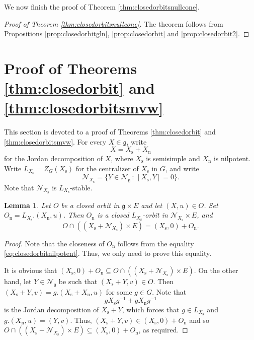 \documentclass[12pt]{amsart}
\newtheorem{lm}{Lemma}[section]
\theoremstyle{definition}
\theoremstyle{remark}\newtheorem{rmk}[lm]{Remark}
\newcommand{\CN}{{\mathcal {N}}}
\newcommand{\rn}{\mathrm{n}}
\newcommand{\rs}{\mathrm{s}}
\newcommand{\g}{\mathfrak g}
\renewcommand{\mid}{\,:\,}
\begin{document}
    We now finish the proof of Theorem \ref{thm:closedorbitsnullcone}.
    \begin{proof}[Proof of Theorem \ref{thm:closedorbitsnullcone}]
        The theorem follows from Propositions \ref{prop:closedorbitgln}, \ref{prop:closedorbit} and \ref{prop:closedorbit2}.
    \end{proof}
    
	\section{Proof of Theorems \ref{thm:closedorbit} and \ref{thm:closedorbitsmvw}}\label{sec:5}
This section is devoted to a proof of Theorems  \ref{thm:closedorbit} and \ref{thm:closedorbitsmvw}.	For every $X\in \g$, write  
	\begin{equation*}
		X=X_{\rs}+X_{\rn}
	\end{equation*}
    for the Jordan decomposition of $X$, where
	$X_{\rs}$ is semisimple and $X_{\rn}$ is nilpotent. 
Write $L_{X_{\rs}}=Z_{G}(X_{\rs})$ for the centralizer of $X_{\rs}$ in $G$, and write
	\begin{equation*}
		\CN_{X_{\rs}}=\{Y\in\CN_{\g}\mid [X_{\rs},Y]=0\}.
	\end{equation*}
    Note that $\CN_{X_{\rs}}$ is $L_{X_{\rs}}$-stable.
	\begin{lm}
		\label{lm:closedorbitnilpotent}
		Let $O$ be a closed orbit in $\g\times E$ and let $(X,u)\in O$. Set $O_{\rn}=L_{X_{\rs}}.(X_{\rn},u)$. Then $O_{\rn}$ is a closed $L_{X_{\rs}}$-orbit in $\CN_{X_{\rs}}\times E$, and
		\begin{equation}
			\label{eq:closedorbitnilpotent}
			O\cap \left((X_{\rs}+\CN_{X_{\rs}})\times E\right)=(X_{\rs},0)+O_{\rn}.
		\end{equation}
	\end{lm}
	\begin{proof}
	Note that	the closeness of $O_{\rn}$ follows from the equality \eqref{eq:closedorbitnilpotent}. Thus, we only need to prove  this equality. 
		
		It is obvious that $(X_{\rs},0)+O_{\rn}\subseteq O\cap \left((X_{\rs}+\CN_{X_{\rs}})\times E\right)$. On the other hand, let $Y\in\CN_{\g}$ be such that $(X_{\rs}+Y,v)\in O$. Then   $(X_{\rs}+Y,v)=g.(X_{\rs}+X_{\rn},u)$ for some $g\in G$. Note that
		\begin{equation*}
			gX_{\rs}g^{-1}+gX_{\rn}g^{-1}
		\end{equation*}
		is the Jordan decomposition of $X_{\rs}+Y$, which forces that $g\in L_{X_{\rs}}$ and $g.(X_{\rn},u)=(Y,v)$. Thus, $(X_{\rs}+Y,v)\in(X_{\rs},0)+O_{\rn}$ and so $O\cap \left((X_{\rs}+\CN_{X_{\rs}})\times E\right)\subseteq(X_{\rs},0)+O_{\rn}$, as required. 
	\end{proof}
	
\end{document}
